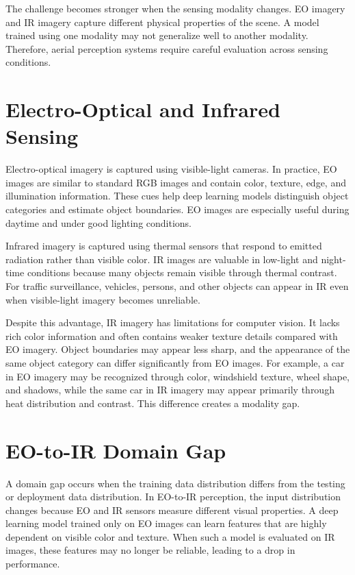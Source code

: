 The challenge becomes stronger when the sensing modality changes. EO imagery and IR imagery capture different physical properties of the scene. A model trained using one modality may not generalize well to another modality. Therefore, aerial perception systems require careful evaluation across sensing conditions.

\section{Electro-Optical and Infrared Sensing}

Electro-optical imagery is captured using visible-light cameras. In practice, EO images are similar to standard RGB images and contain color, texture, edge, and illumination information. These cues help deep learning models distinguish object categories and estimate object boundaries. EO images are especially useful during daytime and under good lighting conditions.

Infrared imagery is captured using thermal sensors that respond to emitted radiation rather than visible color. IR images are valuable in low-light and night-time conditions because many objects remain visible through thermal contrast. For traffic surveillance, vehicles, persons, and other objects can appear in IR even when visible-light imagery becomes unreliable.

Despite this advantage, IR imagery has limitations for computer vision. It lacks rich color information and often contains weaker texture details compared with EO imagery. Object boundaries may appear less sharp, and the appearance of the same object category can differ significantly from EO images. For example, a car in EO imagery may be recognized through color, windshield texture, wheel shape, and shadows, while the same car in IR imagery may appear primarily through heat distribution and contrast. This difference creates a modality gap.

\section{EO-to-IR Domain Gap}

A domain gap occurs when the training data distribution differs from the testing or deployment data distribution. In EO-to-IR perception, the input distribution changes because EO and IR sensors measure different visual properties. A deep learning model trained only on EO images can learn features that are highly dependent on visible color and texture. When such a model is evaluated on IR images, these features may no longer be reliable, leading to a drop in performance.

